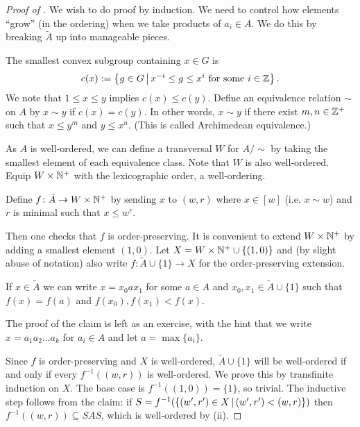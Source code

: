 \begin{proof}[Proof of ]
    We wish to do proof by induction.
    We need to control how elements ``grow'' (in the ordering) when we take products of $a_i \in A$.
    We do this by breaking $\tilde{A}$ up into manageable pieces.

    The smallest convex subgroup containing $x \in G$ is \[
        c(x) := \left\{ g \in G \,\middle|\, x^{-i} \leq g \leq x^i \text{ for some } i \in \mathbb{Z} \right\}.
    \]
    We note that $1 \leq x \leq y$ implies $c(x) \leq c(y)$.
    Define an equivalence relation $\sim$ on $A$ by $x \sim y$ if $c(x) = c(y)$.
    In other words, $x \sim y$ if there exist $m, n \in \mathbb{Z}^+$ such that $x \leq y^m$ and $y \leq x^n$.
    (This is called Archimedean equivalence.)

    As $A$ is well-ordered, we can define a transversal $W$ for $A / {\sim}$ by taking the smallest element of each equivalence class.
    Note that $W$ is also well-ordered.
    Equip $W \times \mathbb{N}^+$ with the lexicographic order, a well-ordering.

    Define $f \colon \tilde{A} \to W \times \mathbb{N}^+$ by sending $x$ to $(w, r)$ where $x \in [w]$ (i.e. $x \sim w$) and $r$ is minimal such that $x \leq w^r$.

    Then one checks that $f$ is order-preserving.
    It is convenient to extend $W \times \mathbb{N}^+$ by adding a smallest element $(1, 0)$.
    Let $X = W \times \mathbb{N}^+ \cup \{ (1, 0) \}$ and (by slight abuse of notation) also write $f \colon \tilde{A} \cup \{1\} \to X$ for the order-preserving extension.

    \begin{claim}
        If $x \in \tilde{A}$ we can write $x = x_0 a x_1$ for some $a \in A$ and $x_0, x_1 \in \tilde{A} \cup \{1\}$ such that $f(x) = f(a)$ and $f(x_0), f(x_1) < f(x)$.
    \end{claim}

    The proof of the claim is left as an exercise, with the hint that we write $x = a_1 a_2 \dots a_k$ for $a_i \in A$ and let $a = \max \{a_i\}$.

    Since $f$ is order-preserving and $X$ is well-ordered, $\tilde{A} \cup \{1\}$ will be well-ordered if and only if every $f^{-1}((w,r))$ is well-ordered.
    We prove this by transfinite induction on $X$.
    The base case is $f^{-1}((1, 0)) = \{1\}$, so trivial.
    The inductive step follows from the claim: if $S = f^{-1} (\left\{ (w', r') \in X \,\middle|\, (w', r') < (w, r) \right\})$ then $f^{-1}((w, r)) \subseteq SAS$, which is well-ordered by  (ii).
\end{proof}

